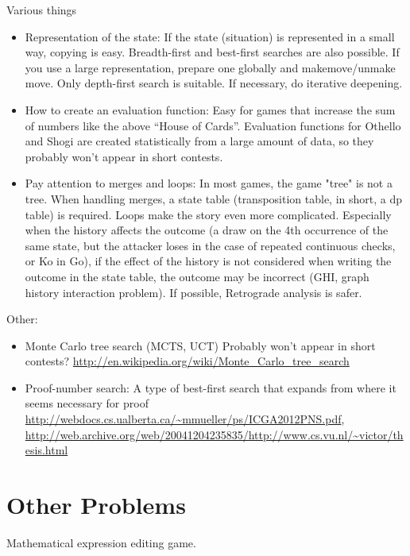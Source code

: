 Various things
\begin{itemize}
\item Representation of the state: If the state (situation) is represented in a small way, copying is easy. Breadth-first and best-first searches are also possible. If you use a large representation, prepare one globally and makemove/unmake move. Only depth-first search is suitable. If necessary, do iterative deepening.
\item How to create an evaluation function: Easy for games that increase the sum of numbers like the above ``House of Cards''. Evaluation functions for Othello and Shogi are created statistically from a large amount of data, so they probably won't appear in short contests.
\item Pay attention to merges and loops: In most games, the game "tree" is not a tree. When handling merges, a state table (transposition table, in short, a dp table) is required. Loops make the story even more complicated. Especially when the history affects the outcome (a draw on the 4th occurrence of the same state, but the attacker loses in the case of repeated continuous checks, or Ko in Go), if the effect of the history is not considered when writing the outcome in the state table, the outcome may be incorrect (GHI, graph history interaction problem). If possible, Retrograde analysis is safer.
\end{itemize}

Other:
\begin{itemize}
\item Monte Carlo tree search (MCTS, UCT) Probably won't appear in short contests? \url{http://en.wikipedia.org/wiki/Monte_Carlo_tree_search}
\item Proof-number search: A type of best-first search that expands from where it seems necessary for proof \url{http://webdocs.cs.ualberta.ca/~mmueller/ps/ICGA2012PNS.pdf},
  \url{http://web.archive.org/web/20041204235835/http://www.cs.vu.nl/~victor/thesis.html}
\end{itemize}

\section{Other Problems}

\begin{pbox}
Mathematical expression editing game.

\end{pbox}

